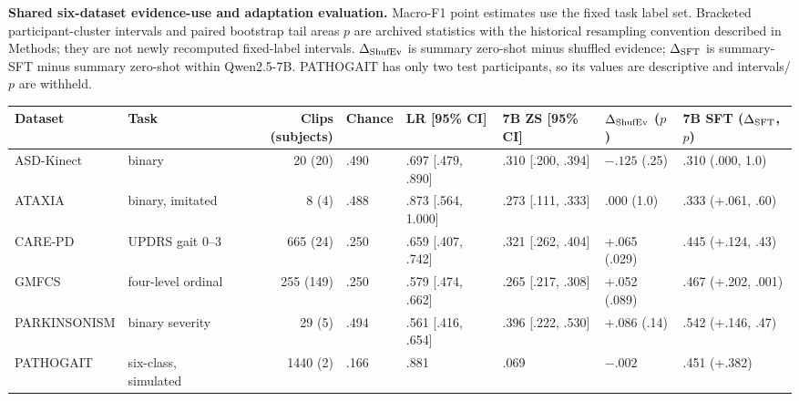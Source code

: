 \begin{importtable}
\centering\small
\caption{\textbf{Shared six-dataset evidence-use and adaptation evaluation.} Macro-F1 point estimates use the fixed task label set. Bracketed participant-cluster intervals and paired bootstrap tail areas $p$ are archived statistics with the historical resampling convention described in Methods; they are not newly recomputed fixed-label intervals. $\Delta_{\rm ShufEv}$ is summary zero-shot minus shuffled evidence; $\Delta_{\rm SFT}$ is summary-SFT minus summary zero-shot within Qwen2.5-7B. PATHOGAIT has only two test participants, so its values are descriptive and intervals/$p$ are withheld.}
\label{v22:tab:evidence_use}
\setlength{\tabcolsep}{3pt}
\begin{adjustbox}{max width=\linewidth}
\begin{tabular}{llrlllll}\toprule
Dataset & Task & Clips (subjects) & Chance & LR [95\% CI] & 7B ZS [95\% CI] & $\Delta_{\rm ShufEv}$ ($p$) & 7B SFT ($\Delta_{\rm SFT}$, $p$)\\\midrule
ASD-Kinect & binary & 20 (20) & .490 & .697 [.479, .890] & .310 [.200, .394] & $-.125$ (.25) & .310 (.000, 1.0)\\
ATAXIA & binary, imitated & 8 (4) & .488 & .873 [.564, 1.000] & .273 [.111, .333] & .000 (1.0) & .333 (+.061, .60)\\
CARE-PD & UPDRS gait 0--3 & 665 (24) & .250 & .659 [.407, .742] & .321 [.262, .404] & +.065 (.029) & .445 (+.124, .43)\\
GMFCS & four-level ordinal & 255 (149) & .250 & .579 [.474, .662] & .265 [.217, .308] & +.052 (.089) & .467 (+.202, .001)\\
PARKINSONISM & binary severity & 29 (5) & .494 & .561 [.416, .654] & .396 [.222, .530] & +.086 (.14) & .542 (+.146, .47)\\
PATHOGAIT & six-class, simulated & 1440 (2) & .166 & .881 & .069 & $-.002$ & .451 (+.382)\\\bottomrule
\end{tabular}
\end{adjustbox}
\end{importtable}
